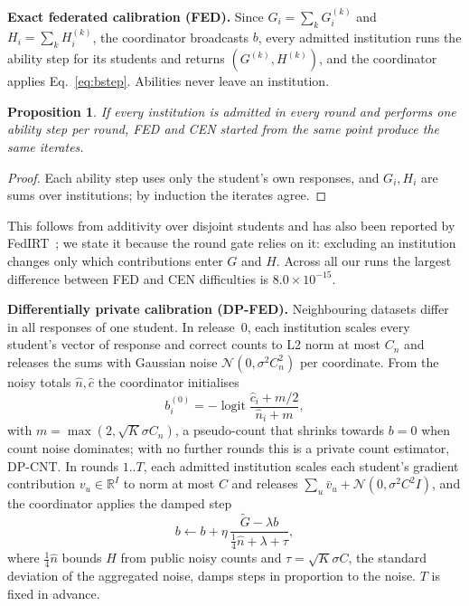\documentclass[pdflatex,iicol,sn-mathphys-num]{sn-jnl}
\theoremstyle{thmstyleone}
\newtheorem{proposition}{Proposition}
\newcommand{\FedMaxDiff}{$8.0\times10^{-15}$}
\begin{document}
\textbf{Exact federated calibration (FED).} Since $G_i=\sum_k G_i^{(k)}$ and $H_i=\sum_k H_i^{(k)}$, the coordinator broadcasts $b$, every admitted institution runs the ability step for its students and returns $(G^{(k)},H^{(k)})$, and the coordinator applies Eq.~\eqref{eq:bstep}. Abilities never leave an institution.

\begin{proposition}\label{prop:exact}
If every institution is admitted in every round and performs one ability step per round, FED and CEN started from the same point produce the same iterates.
\end{proposition}
\begin{proof}
Each ability step uses only the student's own responses, and $G_i,H_i$ are sums over institutions; by induction the iterates agree.
\end{proof}
This follows from additivity over disjoint students and has also been reported by FedIRT~\cite{zhou2025federated}; we state it because the round gate relies on it: excluding an institution changes only which contributions enter $G$ and $H$. Across all our runs the largest difference between FED and CEN difficulties is \FedMaxDiff{}.

\textbf{Differentially private calibration (DP-FED).} Neighbouring datasets differ in all responses of one student. In release~0, each institution scales every student's vector of response and correct counts to L2 norm at most $C_n$ and releases the sums with Gaussian noise $\mathcal{N}(0,\sigma^2C_n^2)$ per coordinate. From the noisy totals $\hat n,\hat c$ the coordinator initialises
\begin{equation}\label{eq:warm}
b_i^{(0)}=-\operatorname{logit}\frac{\hat c_i+m/2}{\hat n_i+m},
\end{equation}
with $m=\max(2,\sqrt{K}\sigma C_n)$, a pseudo-count that shrinks towards $b=0$ when count noise dominates; with no further rounds this is a private count estimator, DP-CNT. In rounds $1..T$, each admitted institution scales each student's gradient contribution $v_u\in\mathbb{R}^I$ to norm at most $C$ and releases $\sum_u \bar v_u+\mathcal{N}(0,\sigma^2C^2 I)$, and the coordinator applies the damped step
\begin{equation}\label{eq:dpstep}
b\leftarrow b+\eta\,\frac{\tilde G-\lambda b}{\tfrac14\hat n+\lambda+\tau},
\end{equation}
where $\tfrac14\hat n$ bounds $H$ from public noisy counts and $\tau=\sqrt{K}\sigma C$, the standard deviation of the aggregated noise, damps steps in proportion to the noise. $T$ is fixed in advance.
\end{document}
